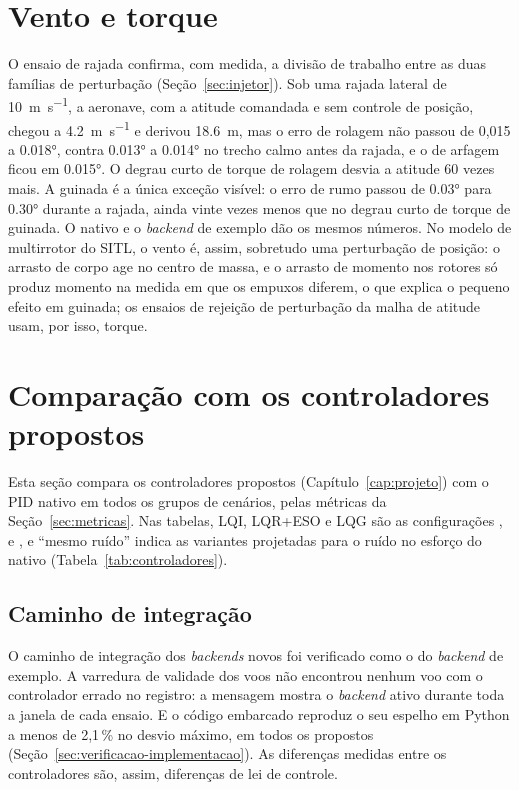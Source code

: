 \section{Vento e torque}
\label{sec:res-vento}

O ensaio de rajada confirma, com medida, a divisão de trabalho entre as duas
famílias de perturbação (Seção~\ref{sec:injetor}). Sob uma rajada lateral de
\SI{10}{\metre\per\second}, a aeronave, com a atitude comandada e sem
controle de posição, chegou a \SI{4.2}{\metre\per\second} e derivou
\SI{18.6}{\metre}, mas o erro de rolagem não passou de 0,015 a \ang{0.018},
contra \ang{0.013} a \ang{0.014} no trecho calmo antes da rajada, e o de
arfagem ficou em \ang{0.015}. O degrau curto de torque de rolagem desvia a
atitude 60 vezes mais. A guinada é a única exceção visível: o erro de rumo
passou de \ang{0.03} para \ang{0.30} durante a rajada, ainda vinte vezes
menos que no degrau curto de torque de guinada. O nativo e o \textit{backend} de exemplo dão os
mesmos números. No modelo de multirrotor do SITL, o vento é, assim,
sobretudo uma perturbação de posição: o arrasto de corpo age no centro de
massa, e o arrasto de momento nos rotores só produz momento na medida em que
os empuxos diferem, o que explica o pequeno efeito em guinada; os ensaios de
rejeição de perturbação da malha de atitude usam, por isso, torque.

\section{Comparação com os controladores propostos}
\label{sec:res-proposto}

Esta seção compara os controladores propostos (Capítulo~\ref{cap:projeto})
com o PID nativo em todos os grupos de cenários, pelas métricas da
Seção~\ref{sec:metricas}. Nas tabelas, LQI, LQR+ESO e LQG são as
configurações ,  e , e
``mesmo ruído'' indica as variantes projetadas para o ruído no esforço do
nativo (Tabela~\ref{tab:controladores}).

\subsection{Caminho de integração}

O caminho de integração dos \textit{backends} novos foi verificado como o do
\textit{backend} de exemplo. A varredura de validade dos voos não encontrou
nenhum voo com o controlador errado no registro: a mensagem 
mostra o \textit{backend} ativo durante toda a janela de cada ensaio. E o
código embarcado reproduz o seu espelho em Python a menos de 2,1\,\% no
desvio máximo, em todos os propostos
(Seção~\ref{sec:verificacao-implementacao}). As diferenças medidas entre os
controladores são, assim, diferenças de lei de controle.

